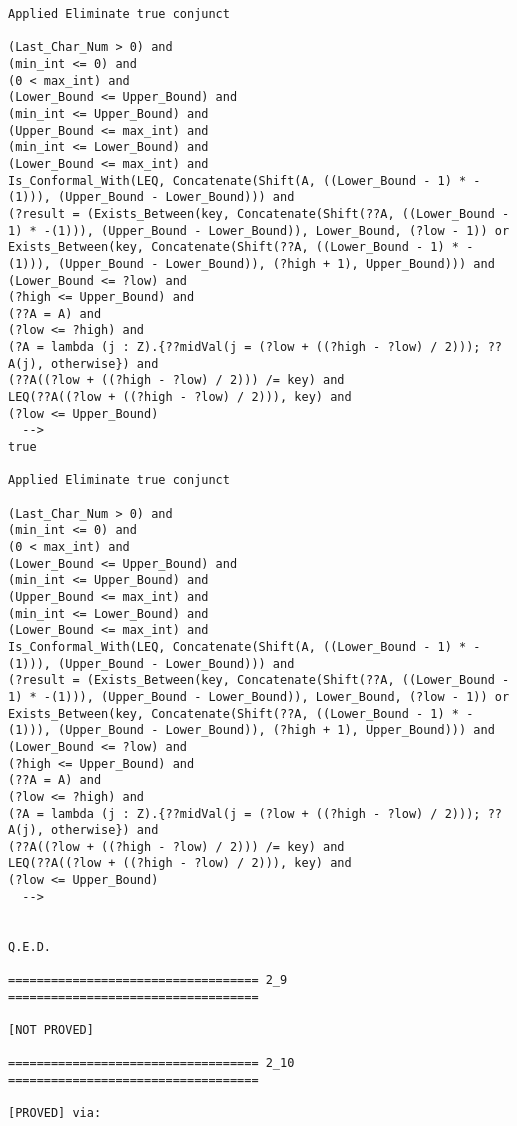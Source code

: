 \begin{lstlisting}[language=resolve]
Applied Eliminate true conjunct

(Last_Char_Num > 0) and
(min_int <= 0) and
(0 < max_int) and
(Lower_Bound <= Upper_Bound) and
(min_int <= Upper_Bound) and
(Upper_Bound <= max_int) and
(min_int <= Lower_Bound) and
(Lower_Bound <= max_int) and
Is_Conformal_With(LEQ, Concatenate(Shift(A, ((Lower_Bound - 1) * -(1))), (Upper_Bound - Lower_Bound))) and
(?result = (Exists_Between(key, Concatenate(Shift(??A, ((Lower_Bound - 1) * -(1))), (Upper_Bound - Lower_Bound)), Lower_Bound, (?low - 1)) or Exists_Between(key, Concatenate(Shift(??A, ((Lower_Bound - 1) * -(1))), (Upper_Bound - Lower_Bound)), (?high + 1), Upper_Bound))) and
(Lower_Bound <= ?low) and
(?high <= Upper_Bound) and
(??A = A) and
(?low <= ?high) and
(?A = lambda (j : Z).{??midVal(j = (?low + ((?high - ?low) / 2))); ??A(j), otherwise}) and
(??A((?low + ((?high - ?low) / 2))) /= key) and
LEQ(??A((?low + ((?high - ?low) / 2))), key) and
(?low <= Upper_Bound)
  -->
true

Applied Eliminate true conjunct

(Last_Char_Num > 0) and
(min_int <= 0) and
(0 < max_int) and
(Lower_Bound <= Upper_Bound) and
(min_int <= Upper_Bound) and
(Upper_Bound <= max_int) and
(min_int <= Lower_Bound) and
(Lower_Bound <= max_int) and
Is_Conformal_With(LEQ, Concatenate(Shift(A, ((Lower_Bound - 1) * -(1))), (Upper_Bound - Lower_Bound))) and
(?result = (Exists_Between(key, Concatenate(Shift(??A, ((Lower_Bound - 1) * -(1))), (Upper_Bound - Lower_Bound)), Lower_Bound, (?low - 1)) or Exists_Between(key, Concatenate(Shift(??A, ((Lower_Bound - 1) * -(1))), (Upper_Bound - Lower_Bound)), (?high + 1), Upper_Bound))) and
(Lower_Bound <= ?low) and
(?high <= Upper_Bound) and
(??A = A) and
(?low <= ?high) and
(?A = lambda (j : Z).{??midVal(j = (?low + ((?high - ?low) / 2))); ??A(j), otherwise}) and
(??A((?low + ((?high - ?low) / 2))) /= key) and
LEQ(??A((?low + ((?high - ?low) / 2))), key) and
(?low <= Upper_Bound)
  -->


Q.E.D.

=================================== 2_9 ===================================

[NOT PROVED]

=================================== 2_10 ===================================

[PROVED] via:


\end{lstlisting}
